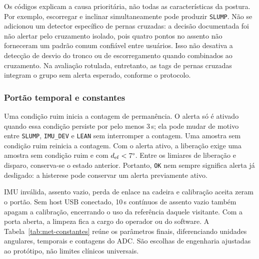 Os códigos explicam a causa prioritária, não todas as características
da postura. Por exemplo, escorregar e inclinar simultaneamente pode
produzir \texttt{SLUMP}. Não se adicionou um detector específico de
pernas cruzadas: a decisão documentada foi não alertar pelo cruzamento
isolado, pois quatro pontos no assento não forneceram um padrão comum
confiável entre usuários. Isso não desativa a detecção de desvio do
tronco ou de escorregamento quando combinados ao cruzamento. Na
avaliação rotulada, entretanto, as tags de pernas cruzadas integram o
grupo sem alerta esperado, conforme o protocolo.

\subsubsection{Portão temporal e constantes}

Uma condição ruim inicia a contagem de permanência. O alerta só é
ativado quando essa condição persiste por pelo menos 3\,s; ela pode
mudar de motivo entre \texttt{SLUMP}, \texttt{IMU\_DEV} e
\texttt{LEAN} sem interromper a contagem. Uma amostra sem condição
ruim reinicia a contagem. Com o alerta ativo, a liberação exige uma
amostra sem condição ruim e com $d_{\mathrm{ef}}<7\degree{}$.
Entre os limiares de liberação e disparo, conserva-se o estado anterior.
Portanto, \texttt{OK} nem sempre significa alerta já desligado: a
histerese pode conservar um alerta previamente ativo.

IMU inválida, assento vazio, perda de enlace na cadeira e calibração
aceita zeram o portão. Sem host USB conectado, 10\,s contínuos de
assento vazio também apagam a calibração, encerrando o uso da
referência daquele visitante. Com a porta aberta, a limpeza fica a
cargo do operador ou do software. A Tabela~\ref{tab:met-constantes}
reúne os parâmetros finais, diferenciando unidades angulares, temporais
e contagens do ADC. São escolhas de engenharia ajustadas ao protótipo,
não limites clínicos universais.

